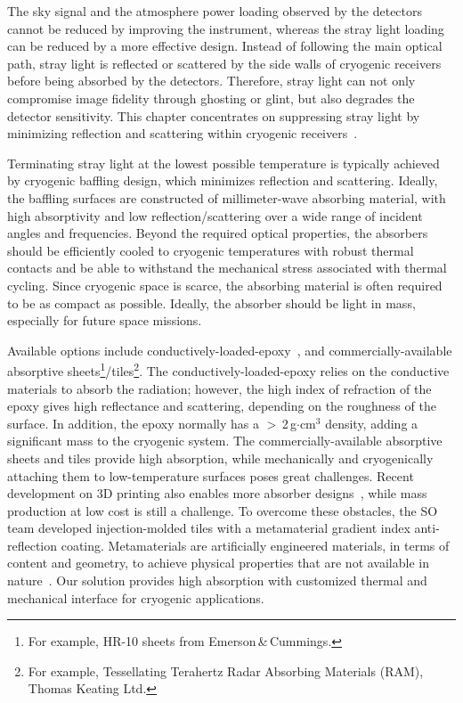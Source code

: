 The sky signal and the atmosphere power loading observed by the detectors cannot be reduced by improving the instrument, whereas the stray light loading can be reduced by a more effective design. Instead of following the main optical path, stray light is reflected or scattered by the side walls of cryogenic receivers before being absorbed by the detectors. Therefore, stray light can not only compromise image fidelity through ghosting or glint, but also degrades the detector sensitivity. This chapter concentrates on suppressing stray light by minimizing reflection and scattering within cryogenic receivers~\cite{iuliano/etal:2018, thornton/etal:2016, sharp/etal:2008}.

Terminating stray light at the lowest possible temperature is typically achieved by cryogenic baffling design, which minimizes reflection and scattering.  Ideally, the baffling surfaces are constructed of millimeter-wave absorbing material, with high absorptivity and low reflection/scattering over a wide range of incident angles and frequencies. Beyond the required optical properties, the absorbers should be efficiently cooled to cryogenic temperatures with robust thermal contacts and be able to withstand the mechanical stress associated with thermal cycling. Since cryogenic space is scarce, the absorbing material is often required to be as compact as possible. Ideally, the absorber should be light in mass, especially for future space missions.

Available options include conductively-loaded-epoxy~\citep{Wollack2008}, and commercially-available absorptive sheets\footnote{For example, HR-10 sheets from Emerson\,\&\,Cummings.}/tiles\footnote{For example, Tessellating Terahertz Radar Absorbing Materials (RAM), Thomas Keating Ltd.}. The conductively-loaded-epoxy relies on the conductive materials to absorb the radiation; however, the high index of refraction of the epoxy gives high reflectance and scattering, depending on the roughness of the surface. In addition, the epoxy normally has a $>$\,2\,g$\cdot$cm$^3$ density, adding a significant mass to the cryogenic system. The commercially-available absorptive sheets and tiles provide high absorption, while mechanically and cryogenically attaching them to low-temperature surfaces poses great challenges. Recent development on 3D printing also enables more absorber designs~\cite{petroff/etal:2019}, while mass production at low cost is still a challenge. To overcome these obstacles, the SO team developed injection-molded tiles with a metamaterial gradient index anti-reflection coating. Metamaterials are artificially engineered materials, in terms of content and geometry, to achieve physical properties that are not available in nature~\cite{wollack/etal:2016, ding/etal:2012, watts/liu/padilla:2012}. Our solution provides high absorption with customized thermal and mechanical interface for cryogenic applications. 

